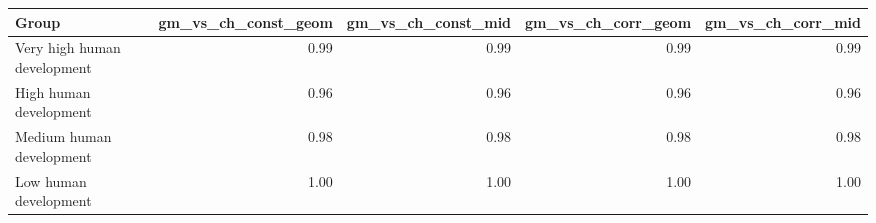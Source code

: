\begin{table}[ht]
\centering
\begin{tabular}{lrrrr}
  \hline
Group & gm\_vs\_ch\_const\_geom & gm\_vs\_ch\_const\_mid & gm\_vs\_ch\_corr\_geom & gm\_vs\_ch\_corr\_mid \\
  \hline
Very high human development & 0.99 & 0.99 & 0.99 & 0.99 \\
  High human development & 0.96 & 0.96 & 0.96 & 0.96 \\
  Medium human development & 0.98 & 0.98 & 0.98 & 0.98 \\
  Low human development & 1.00 & 1.00 & 1.00 & 1.00 \\
   \hline
\end{tabular}
\end{table}
